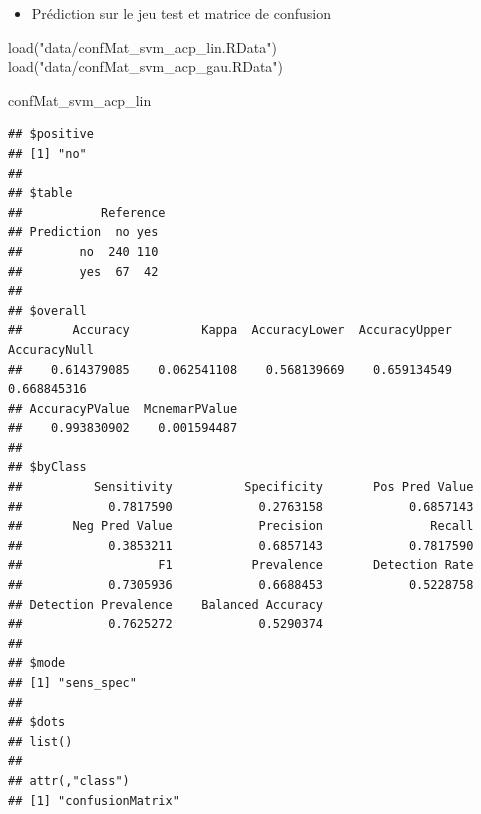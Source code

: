 \documentclass[
  12pt,
]{article}
\newenvironment{Shaded}{\begin{snugshade}}{\end{snugshade}}
\newcommand{\AttributeTok}[1]{\textcolor[rgb]{0.77,0.63,0.00}{#1}}
\newcommand{\FunctionTok}[1]{\textcolor[rgb]{0.00,0.00,0.00}{#1}}
\newcommand{\NormalTok}[1]{#1}
\newcommand{\OtherTok}[1]{\textcolor[rgb]{0.56,0.35,0.01}{#1}}
\newcommand{\SpecialCharTok}[1]{\textcolor[rgb]{0.00,0.00,0.00}{#1}}
\newcommand{\StringTok}[1]{\textcolor[rgb]{0.31,0.60,0.02}{#1}}
\providecommand{\tightlist}{%
  \setlength{\itemsep}{0pt}\setlength{\parskip}{0pt}}
\begin{document}
\begin{itemize}
\tightlist
\item
  Prédiction sur le jeu test et matrice de confusion
\end{itemize}

\begin{Shaded}
\end{Shaded}

\begin{Shaded}
\begin{Highlighting}[]
\FunctionTok{load}\NormalTok{(}\StringTok{"data/confMat\_svm\_acp\_lin.RData"}\NormalTok{)}
\FunctionTok{load}\NormalTok{(}\StringTok{"data/confMat\_svm\_acp\_gau.RData"}\NormalTok{)}

\NormalTok{confMat\_svm\_acp\_lin}
\end{Highlighting}
\end{Shaded}

\begin{verbatim}
## $positive
## [1] "no"
## 
## $table
##           Reference
## Prediction  no yes
##        no  240 110
##        yes  67  42
## 
## $overall
##       Accuracy          Kappa  AccuracyLower  AccuracyUpper   AccuracyNull 
##    0.614379085    0.062541108    0.568139669    0.659134549    0.668845316 
## AccuracyPValue  McnemarPValue 
##    0.993830902    0.001594487 
## 
## $byClass
##          Sensitivity          Specificity       Pos Pred Value 
##            0.7817590            0.2763158            0.6857143 
##       Neg Pred Value            Precision               Recall 
##            0.3853211            0.6857143            0.7817590 
##                   F1           Prevalence       Detection Rate 
##            0.7305936            0.6688453            0.5228758 
## Detection Prevalence    Balanced Accuracy 
##            0.7625272            0.5290374 
## 
## $mode
## [1] "sens_spec"
## 
## $dots
## list()
## 
## attr(,"class")
## [1] "confusionMatrix"
\end{verbatim}
\end{document}

